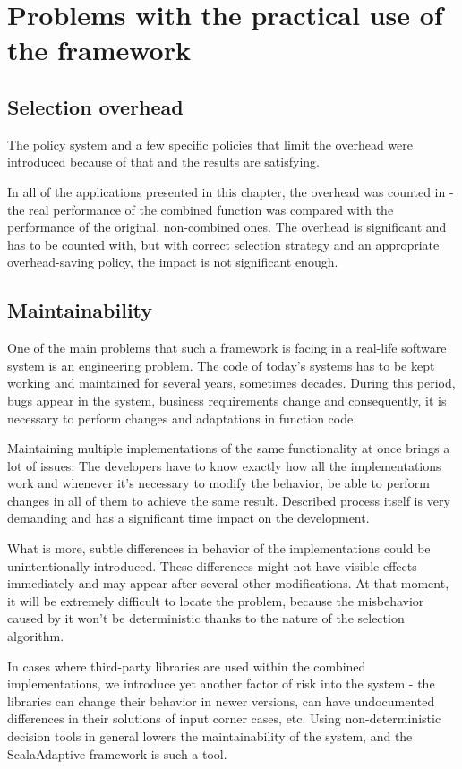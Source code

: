 \section{Problems with the practical use of the framework}

\subsection{Selection overhead}

The policy system and a few specific policies that limit the overhead were introduced because of that and the results are satisfying.

In all of the applications presented in this chapter, the overhead was counted in - the real performance of the combined function was compared with the performance of the original, non-combined ones. The overhead is significant and has to be counted with, but with correct selection strategy and an appropriate overhead-saving policy, the impact is not significant enough.

\subsection{Maintainability}

One of the main problems that such a framework is facing in a real-life software system is an engineering problem. The code of today's systems has to be kept working and maintained for several years, sometimes decades. During this period, bugs appear in the system, business requirements change and consequently, it is necessary to perform changes and adaptations in function code.

Maintaining multiple implementations of the same functionality at once brings a lot of issues. The developers have to know exactly how all the implementations work and whenever it's necessary to modify the behavior, be able to perform changes in all of them to achieve the same result. Described process itself is very demanding and has a significant time impact on the development. 

What is more, subtle differences in behavior of the implementations could be unintentionally introduced. These differences might not have visible effects immediately and may appear after several other modifications. At that moment, it will be extremely difficult to locate the problem, because the misbehavior caused by it won't be deterministic thanks to the nature of the selection algorithm.

In cases where third-party libraries are used within the combined implementations, we introduce yet another factor of risk into the system - the libraries can change their behavior in newer versions, can have undocumented differences in their solutions of input corner cases, etc. Using non-deterministic decision tools in general lowers the maintainability of the system, and the ScalaAdaptive framework is such a tool.

